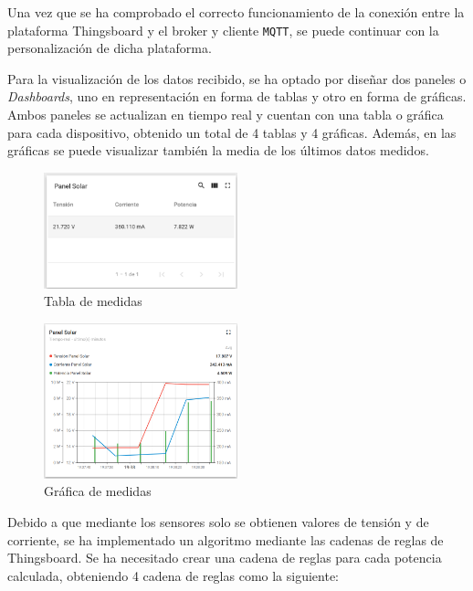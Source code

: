 Una vez que se ha comprobado el correcto funcionamiento de la conexión entre la plataforma Thingsboard y el broker y cliente \texttt{MQTT}, se puede continuar con la personalización de dicha plataforma.

Para la visualización de los datos recibido, se ha optado por diseñar dos paneles o \textit{Dashboards}, uno en representación en forma de tablas y otro en forma de gráficas. Ambos paneles se actualizan en tiempo real y cuentan con una tabla o gráfica para cada dispositivo, obtenido un total de 4 tablas y 4 gráficas. Además, en las gráficas se puede visualizar también la media de los últimos datos medidos.

\begin{figure}[H]
    \centering
    \includegraphics[width=0.5\textwidth]{images/3-software/3-2-2-thingsboard/TablaThingsBoard.png}
    \caption{Tabla de medidas}
    \label{fig:3-2-2-TablaThingsBoard}
\end{figure}

\begin{figure}[H]
    \centering
    \includegraphics[width=0.5\textwidth]{images/3-software/3-2-2-thingsboard/GraficaThingsBoard.png}
    \caption{Gráfica de medidas}
    \label{fig:3-2-2-GraficaThingsBoard}
\end{figure}

Debido a que mediante los sensores solo se obtienen valores de tensión y de corriente, se ha implementado un algoritmo mediante las cadenas de reglas de Thingsboard. Se ha necesitado crear una cadena de reglas para cada potencia calculada, obteniendo 4 cadena de reglas como la siguiente:

